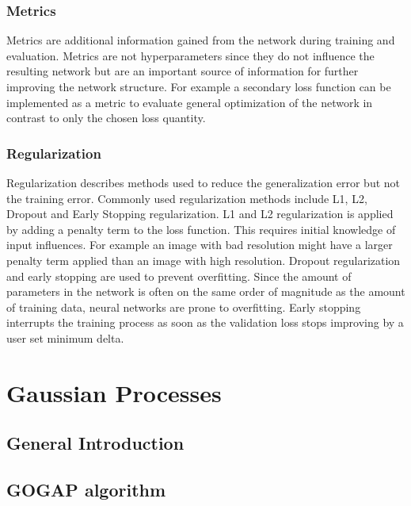 			\subsubsection{Metrics}
				Metrics are additional information gained from the network during training and evaluation. Metrics are not hyperparameters since they do not influence the resulting network but are an important source of information for further improving the network structure. For example a secondary loss function can be implemented as a metric to evaluate general optimization of the network in contrast to only the chosen loss quantity. 
			\subsubsection{Regularization}
				Regularization describes methods used to reduce the generalization error but not the training error. Commonly used regularization methods include L1, L2, Dropout and Early Stopping regularization. L1 and L2 regularization is applied by adding a penalty term to the loss function. This requires initial knowledge of input influences. For example an image with bad resolution might have a larger penalty term applied than an image with high resolution. Dropout regularization and early stopping are used to prevent overfitting. Since the amount of parameters in the network is often on the same order of magnitude as the amount of training data, neural networks are prone to overfitting. Early stopping interrupts the training process as soon as the validation loss stops improving by a user set minimum delta. 
	\section{Gaussian Processes}
		\subsection{General Introduction}
		\subsection{GOGAP algorithm}
